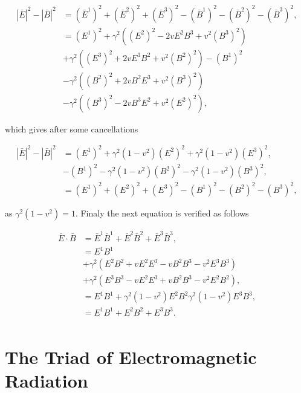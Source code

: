 \begin{appendix}
\begin{align*} 
{|\bar{E}|}^2 - {|\bar{B}|}^2 & = {(\bar{E}^1)}^2 + {(\bar{E}^2)}^2 + {(\bar{E}^3)}^2 - {(\bar{B}^1)}^2 - {(\bar{B}^2)}^2 - {(\bar{B}^3)}^2,\\
                              & = (E^1)^2 + \gamma^2 ((E^2)^2 - 2vE^2B^3 + v^2 (B^3)^2) \\
                              & + \gamma^2 ((E^3)^2 + 2vE^3 B^2 + v^2 (B^2)^2) - (B^1)^2 \\
                              & - \gamma^2 ((B^2)^2 + 2vB^2E^3 + v^2 (B^3)^2) \\
                              & - \gamma^2 ((B^3)^2 - 2vB^3E^2 + v^2 (E^2)^2),
\end{align*}

\noindent which gives after some cancellations

\begin{align*}
{|\bar{E}|}^2 - {|\bar{B}|}^2 & = (E^1)^2 + \gamma^2 (1-v^2)(E^2)^2 + \gamma^2 (1-v^2)(E^3)^2, \\
                              & - (B^1)^2 - \gamma^2 (1-v^2)(B^2)^2 - \gamma^2 (1-v^2)(B^3)^2, \\
                              & = {({E}^1)}^2 + {({E}^2)}^2 + {({E}^3)}^2 - {({B}^1)}^2 - {({B}^2)}^2 - {({B}^3)}^2,
\end{align*}

\noindent as $\gamma^2 (1-v^2) = 1$. Finaly the next equation is verified as follows

\begin{align*}
\bar{E} \cdot \bar{B} & = \bar{E}^1\bar{B}^1 + \bar{E}^2\bar{B}^2 + \bar{E}^3\bar{B}^3, \\
                      & = E^1B^1 \\
                      & + \gamma^2 (E^2B^2 + vE^2E^3 - vB^2B^3 - v^2E^3B^3) \\
                      & + \gamma^2 (E^3B^3 - vE^2E^3 + vB^2B^3 - v^2 E^2B^2), \\
                      & = E^1B^1 + \gamma^2 (1-v^2)E^2B^2 \gamma^2 (1-v^2)E^3B^3,\\ 
                      & = {E}^1{B}^1 + {E}^2{B}^2 + {E}^3{B}^3. \\
\end{align*}

\section{The Triad of Electromagnetic Radiation}\label{Appendix_Orthonormal_Triad}


\end{appendix}
